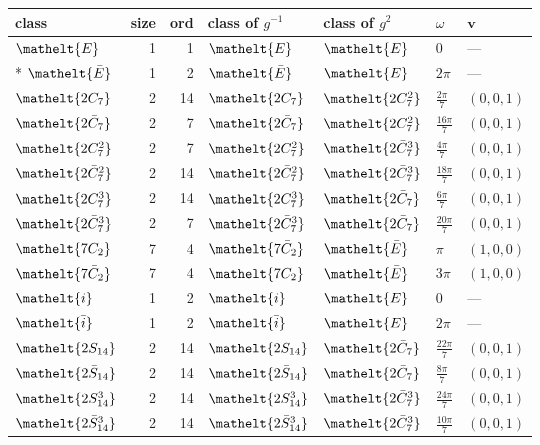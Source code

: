 \documentclass[10pt,a4paper]{article}
\numberwithin{equation}{section}
\newcommand{\eltfont}[1]{{\let\sigma\eltsigma\mathelt{#1}}}
\newcommand{\cls}[1]{\eltfont{#1}}
\newcommand{\dirvec}[3]{(#1, #2, #3)}
\newcommand{\vv}{\mathbf{v}}
\newcommand{\barred}[1]{\bar{#1}}
\begin{document}
{\renewcommand{\arraystretch}{1.3}\begin{longtable}{@{}lrrllll@{}}\toprule
class & size & ord & class of $g^{-1}$ & class of $g^{2}$ & $\omega$ & $\vv$\\\midrule\endhead
\bottomrule\endfoot\endlastfoot
$\cls{E}$ & 1 & 1 & $\cls{E}$ & $\cls{E}$ & $0$ & ---\\*
$\cls{\barred{E}}$ & 1 & 2 & $\cls{\barred{E}}$ & $\cls{E}$ & $2\pi$ & ---\\
$\cls{2C_{7}}$ & 2 & 14 & $\cls{2C_{7}}$ & $\cls{2C_{7}^{2}}$ & $\tfrac{2\pi}{7}$ & $\dirvec{0}{0}{1}$\\
$\cls{2\barred{C}_{7}}$ & 2 & 7 & $\cls{2\barred{C}_{7}}$ & $\cls{2C_{7}^{2}}$ & $\tfrac{16\pi}{7}$ & $\dirvec{0}{0}{1}$\\
$\cls{2C_{7}^{2}}$ & 2 & 7 & $\cls{2C_{7}^{2}}$ & $\cls{2\barred{C}_{7}^{3}}$ & $\tfrac{4\pi}{7}$ & $\dirvec{0}{0}{1}$\\
$\cls{2\barred{C}_{7}^{2}}$ & 2 & 14 & $\cls{2\barred{C}_{7}^{2}}$ & $\cls{2\barred{C}_{7}^{3}}$ & $\tfrac{18\pi}{7}$ & $\dirvec{0}{0}{1}$\\
$\cls{2C_{7}^{3}}$ & 2 & 14 & $\cls{2C_{7}^{3}}$ & $\cls{2\barred{C}_{7}}$ & $\tfrac{6\pi}{7}$ & $\dirvec{0}{0}{1}$\\
$\cls{2\barred{C}_{7}^{3}}$ & 2 & 7 & $\cls{2\barred{C}_{7}^{3}}$ & $\cls{2\barred{C}_{7}}$ & $\tfrac{20\pi}{7}$ & $\dirvec{0}{0}{1}$\\
$\cls{7C_{2}}$ & 7 & 4 & $\cls{7\barred{C}_{2}}$ & $\cls{\barred{E}}$ & $\pi$ & $\dirvec{1}{0}{0}$\\
$\cls{7\barred{C}_{2}}$ & 7 & 4 & $\cls{7C_{2}}$ & $\cls{\barred{E}}$ & $3\pi$ & $\dirvec{1}{0}{0}$\\
$\cls{i}$ & 1 & 2 & $\cls{i}$ & $\cls{E}$ & $0$ & ---\\
$\cls{\barred{i}}$ & 1 & 2 & $\cls{\barred{i}}$ & $\cls{E}$ & $2\pi$ & ---\\
$\cls{2S_{14}}$ & 2 & 14 & $\cls{2S_{14}}$ & $\cls{2\barred{C}_{7}}$ & $\tfrac{22\pi}{7}$ & $\dirvec{0}{0}{1}$\\
$\cls{2\barred{S}_{14}}$ & 2 & 14 & $\cls{2\barred{S}_{14}}$ & $\cls{2\barred{C}_{7}}$ & $\tfrac{8\pi}{7}$ & $\dirvec{0}{0}{1}$\\
$\cls{2S_{14}^{3}}$ & 2 & 14 & $\cls{2S_{14}^{3}}$ & $\cls{2\barred{C}_{7}^{3}}$ & $\tfrac{24\pi}{7}$ & $\dirvec{0}{0}{1}$\\
$\cls{2\barred{S}_{14}^{3}}$ & 2 & 14 & $\cls{2\barred{S}_{14}^{3}}$ & $\cls{2\barred{C}_{7}^{3}}$ & $\tfrac{10\pi}{7}$ & $\dirvec{0}{0}{1}$\\

\end{longtable}}
\end{document}
